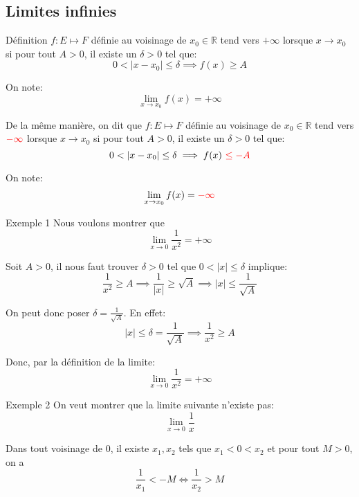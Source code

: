 \documentclass[a4paper]{article}
\begin{document}
\subsection{Limites infinies}
\begin{parag}{Définition}
    $f : E \mapsto F$ définie au voisinage de $x_0 \in \mathbb{R}$ tend vers $+\infty$ lorsque $x \to x_0$ si pour tout $A > 0$, il existe un $\delta > 0$ tel que:
    \[0 < \left|x - x_0\right| \leq \delta \implies f\left(x\right) \geq A\]

    On note:
    \[\lim_{x \to x_0} f\left(x\right) = +\infty\]

    De la même manière, on dit que $f : E \mapsto F$ définie au voisinage de $x_0 \in \mathbb{R}$ tend vers ${\color{red}-\infty}$ lorsque $x \to x_0$ si pour tout $A > 0$, il existe un $\delta > 0$ tel que:
    \[0 < \left|x - x_0\right| \leq \delta \implies f\left(x\right)\ {\color{red}\leq -A}\]

    On note:
    \[\lim_{x \to x_0} f\left(x\right) = {\color{red} -\infty}\]
\end{parag}

\begin{parag}{Exemple 1}
    Nous voulons montrer que
    \[\lim_{x \to 0} \frac{1}{x^2} = +\infty\]

    Soit $A > 0$, il nous faut trouver $\delta > 0$ tel que $0 < \left|x\right| \leq \delta$ implique:
    \[\frac{1}{x^2} \geq A \implies \frac{1}{\left|x\right|} \geq \sqrt{A} \implies \left|x\right| \leq \frac{1}{\sqrt{A}}\]

    On peut donc poser $\delta = \frac{1}{\sqrt{A}}$. En effet:
    \[\left|x\right| \leq \delta = \frac{1}{\sqrt{A}} \implies \frac{1}{x^2} \geq A\]

    Donc, par la définition de la limite:
    \[\lim_{x \to 0} \frac{1}{x^2} = +\infty\]
\end{parag}

\begin{parag}{Exemple 2}
    On veut montrer que la limite suivante n'existe pas:
    \[\lim_{x \to 0} \frac{1}{x}\]

    Dans tout voisinage de $0$, il existe $x_1,x_2$ tels que $x_1 < 0 < x_2$ et pour tout $M > 0$, on a
    \[\frac{1}{x_1} < -M \iff \frac{1}{x_2} > M\]

\end{parag}
\end{document}
